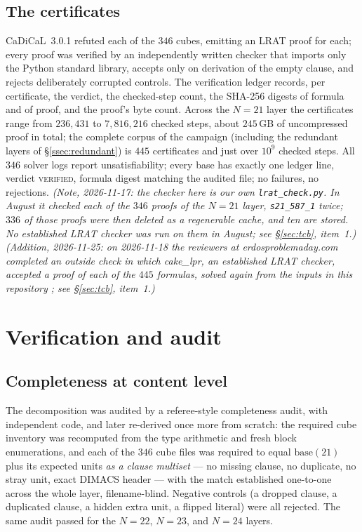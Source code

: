 \documentclass[11pt]{amsart}
\theoremstyle{plain}
\theoremstyle{definition}
\theoremstyle{remark}
\begin{document}
\subsection{The certificates}\label{ssec:certs}
CaDiCaL~3.0.1 \cite{CaDiCaL} refuted each of the $346$ cubes,
emitting an LRAT proof \cite{LRAT} for each; every proof was verified by
an independently written checker that imports only the Python standard
library, accepts only on derivation of the empty clause, and rejects
deliberately corrupted controls. The verification ledger records, per
certificate, the verdict, the checked-step count, the SHA-256
digests of formula and of proof, and the proof's byte count. Across the
$N=21$ layer the certificates range from $236{,}431$ to $7{,}816{,}216$
checked steps, about $245$\,GB of uncompressed proof in total; the
complete corpus of the campaign (including the redundant layers of
\S\ref{ssec:redundant}) is $445$ certificates and just over $10^9$
checked steps. All $346$ solver logs report unsatisfiability; every
base has exactly one ledger line, verdict \textsc{verified}, formula
digest matching the audited file; no failures, no rejections.
\emph{(Note, 2026-11-17: the checker here is our own
\texttt{lrat\_check.py}. In August it checked each of the $346$ proofs of
the $N=21$ layer, \texttt{s21\_587\_1} twice; $336$ of those proofs were
then deleted as a regenerable cache, and ten are stored. No established
LRAT checker was run on them in August; see \S\ref{sec:tcb}, item~1.)}
\emph{(Addition, 2026-11-25: on 2026-11-18 the reviewers at
erdosproblemaday.com completed an outside check in which cake\_lpr, an
established LRAT checker, accepted a proof of each of the $445$
formulas, solved again from the inputs in this repository
\cite{EPD26}; see \S\ref{sec:tcb}, item~1.)}

\section{Verification and audit}\label{sec:verif}

\subsection{Completeness at content level}\label{ssec:complete}
The decomposition was audited by a referee-style completeness audit,
with independent code, and later re-derived once more from scratch: the
required cube inventory was recomputed from the type arithmetic and
fresh block enumerations, and each of the $346$ cube files was required
to equal $\mathrm{base}(21)$ plus its expected units \emph{as a clause
multiset} --- no missing clause, no duplicate, no stray unit, exact
DIMACS header --- with the match established one-to-one across the
whole layer, filename-blind. Negative controls (a dropped
clause, a duplicated clause, a hidden extra unit, a flipped literal)
were all rejected. The same audit passed for the $N=22$, $N=23$, and
$N=24$ layers.
\end{document}
